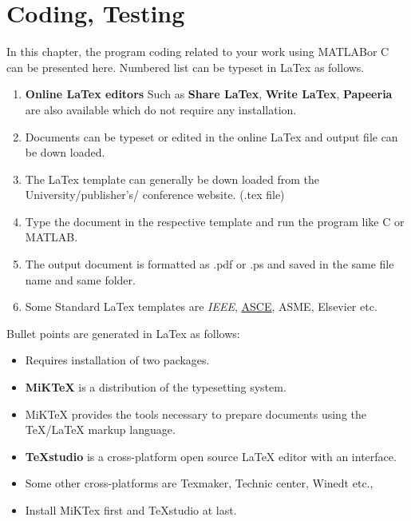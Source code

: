 \documentclass[BTech]{srmuthesis}
\begin{document}
         \chapter{Coding, Testing}
In this chapter, the program coding related to your work using MATLAB\texttrademark or C can be presented here. Numbered list can be typeset in LaTex as follows.
\begin{enumerate}
   \item  \textbf{Online LaTex editors} Such as \textbf{Share LaTex}, \textbf{Write LaTex}, \textbf{Papeeria} 
    are also available which do not require any installation. \vspace{5mm}
   \item  Documents can be typeset or edited in the online LaTex and output file can be down loaded.\vspace{5mm}
   \item  The LaTex template can generally be down loaded from the University/publisher's/ conference website. (.tex file) \vspace{5mm}
   \item Type the document in the respective template and run the program like C or MATLAB. \vspace{5mm}
   \item  The output document is formatted as .pdf or .ps and saved in the same file name and same folder. \vspace{5mm}
   \item  Some Standard LaTex templates are \textit{IEEE}, \underline{ASCE}, \textsf{ASME}, Elsevier etc. \vspace{5mm}
   \end{enumerate}
   Bullet points are generated in LaTex as follows:
   \begin{itemize}
          \item [\ding{92}] Requires installation of two packages.
     \item [\ding{92}]\textbf{MiKTeX} is a distribution of the typesetting system.
     \item [\ding{92}] MiKTeX provides the tools necessary to prepare documents using the TeX/LaTeX markup language. 
     \item [\ding{92}] \textbf{TeXstudio} is a cross-platform open source LaTeX editor with an interface. 
     \item [\ding{92}] Some other cross-platforms are Texmaker, Technic center, Winedt etc.,
     \item [\ding{92}] Install MiKTex first and TeXstudio at last.
      \end{itemize}
\end{document}
